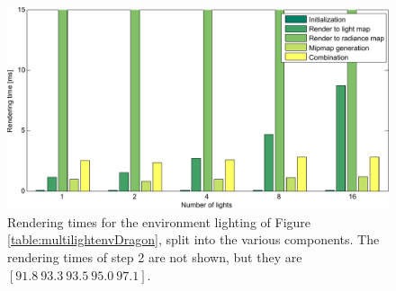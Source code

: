 \begin{figure}[!ht]
\centering
  \includegraphics[width=0.8\linewidth]{images/matlab/multiple_lights_test.pdf}

\caption{Rendering times for the environment lighting of Figure \ref{table:multilightenvDragon}, split into the various components. The rendering times of step 2 are not shown, but they are $[91.8\ 93.3\ 93.5\ 95.0\ 97.1]$.}
\label{fig:numblights}
\end{figure}
